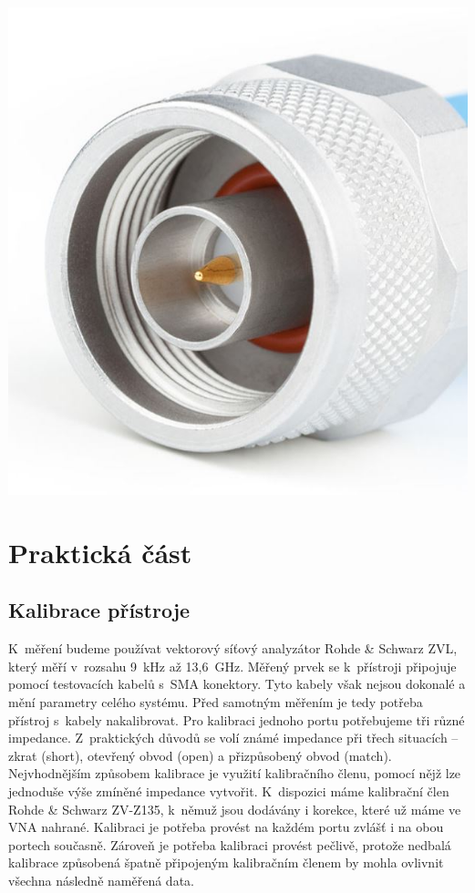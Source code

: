 \documentclass{protokol}
\begin{document}
\begin{center}
\begin{minipage}{0.29\textwidth}
		\includegraphics[width=\textwidth]{connector-n}
		\label{N}
	\end{minipage}
\end{center}

\section{Praktická část}
\subsection{Kalibrace přístroje}
K~měření budeme používat vektorový síťový analyzátor Rohde \& Schwarz ZVL,
který měří v~rozsahu 9~kHz až 13,6~GHz.
Měřený prvek se k~přístroji připojuje pomocí testovacích kabelů s~SMA konektory.
Tyto kabely však nejsou dokonalé a mění parametry celého systému.
Před samotným měřením je tedy potřeba přístroj s~kabely nakalibrovat.
Pro kalibraci jednoho portu potřebujeme tři různé impedance.
Z~praktických důvodů se volí známé impedance při třech situacích -- zkrat (short),
otevřený obvod (open) a přizpůsobený obvod (match).
Nejvhodnějším způsobem kalibrace je využití kalibračního členu,
pomocí nějž lze jednoduše výše zmíněné impedance vytvořit.
K~dispozici máme kalibrační člen Rohde \& Schwarz ZV-Z135,
k~němuž jsou dodávány i korekce, které už máme ve VNA nahrané.
Kalibraci je potřeba provést na každém portu zvlášť i na obou portech současně.
Zároveň je potřeba kalibraci provést pečlivě,
protože nedbalá kalibrace způsobená špatně připojeným kalibračním členem
by mohla ovlivnit všechna následně naměřená data.
\end{document}
